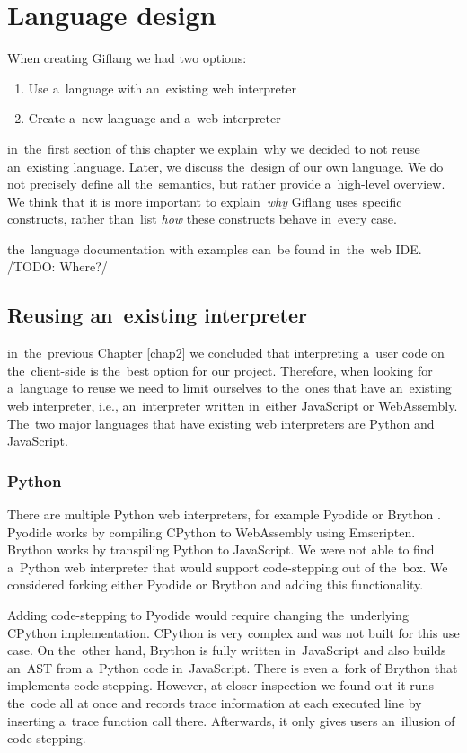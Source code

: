 
\chapter{Language design}
\label{chap3:language_design}

When creating Giflang we had two options:
\begin{enumerate}
    \item Use a~language with an~existing web interpreter
    \item Create a~new language and a~web interpreter
\end{enumerate}

in~the~first section of this chapter we explain~why we decided to not reuse an~existing language. Later, we discuss the~design of our own language. We do not
precisely define all the~semantics, but rather provide a~high-level overview. We think that it is more important to explain~\emph{why} Giflang uses specific
constructs, rather than~list \emph{how} these constructs behave in~every case.

the~language documentation with examples can~be found in~the~web IDE. /TODO: Where?/

\section{Reusing an~existing interpreter}
in~the~previous Chapter \ref{chap2} we concluded that interpreting a~user code on the~client-side is the~best option for our project. Therefore, when
looking for a~language to reuse we need to limit ourselves to the~ones that have an~existing web interpreter, i.e., an~interpreter written in~either
JavaScript or WebAssembly. The~two major languages that have existing web interpreters are Python and JavaScript.

\subsection{Python}
There are multiple Python web interpreters, for example Pyodide \cite{Pyodide} or Brython \cite{Brython}. Pyodide works by compiling CPython \cite{CPython}
to WebAssembly using Emscripten. Brython works by transpiling Python to JavaScript. We were not able to find a~Python web interpreter that would
support code-stepping out of the~box. We considered forking either Pyodide or Brython and adding this functionality.

Adding code-stepping to Pyodide would require changing the~underlying CPy\-thon implementation. CPython is very complex and was not built for this use case.
On the~other hand, Brython is fully written in~JavaScript and also builds an~AST from a~Python code in~JavaScript. There
is even a~fork of Brython \cite{PythonDebugger} that implements code-stepping. However, at closer inspection we found out it runs the~code all at once and records trace information
at each executed line by inserting a~trace function call there. Afterwards, it only gives users an~illusion of code-stepping.

